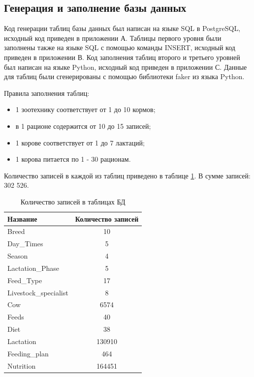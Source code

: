 \subsection{Генерация и заполнение базы данных}

Код генерации таблиц базы данных был написан на языке SQL в PostgreSQL, исходный код приведен в приложении А. Таблицы первого уровня были заполнены также на языке SQL с помощью команды INSERT, исходный код приведен в приложении В. Код заполнения таблиц второго и третьего уровней был написан на языке Python, исходный код приведен в приложении С. Данные для таблиц были сгенерированы с помощью библиотеки faker из языка Python. 

Правила заполнения таблиц:
\begin{itemize}
\item 1 зоотехнику соответствует от 1 до 10 кормов;
\item в 1 рационе содержится от 10 до 15 записей;
\item 1 корове соответствует от 1 до 7 лактаций;
\item 1 корова питается по 1 - 30 рационам.
\end{itemize}

Количество записей в каждой из таблиц приведено в таблице \ref{tab:записи}. В сумме записей: 302 526.

\begin{table}[h]
\centering
\caption{Количество записей в таблицах БД}
\label{tab:записи}
\begin{tabular}{|l|c|}
\hline
\textbf{Название} & \textbf{Количество записей} \\
\hline
Breed & 10 \\
Day\_Times & 5 \\
Season & 4 \\
Lactation\_Phase & 5 \\
Feed\_Type & 17 \\
Livestock\_specialist & 8 \\
Cow & 6574 \\
Feeds & 40 \\
Diet & 38 \\
Lactation & 130910 \\
Feeding\_plan & 464 \\
Nutrition & 164451 \\
\hline
\end{tabular}
\end{table}